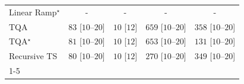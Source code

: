 \begin{tabular}{l|cccc|}
Linear Ramp$^\star$ & {\cellcolor[HTML]{000000}} \color[HTML]{F1F1F1} {\cellcolor{white}} \color{black} - & {\cellcolor[HTML]{000000}} \color[HTML]{F1F1F1} {\cellcolor{white}} \color{black} - & {\cellcolor[HTML]{000000}} \color[HTML]{F1F1F1} {\cellcolor{white}} \color{black} - & {\cellcolor[HTML]{000000}} \color[HTML]{F1F1F1} {\cellcolor{white}} \color{black} - \\
TQA & {\cellcolor[HTML]{E8F6E3}} \color[HTML]{000000} $83$ [$10$--$20$] & {\cellcolor[HTML]{F7FCF5}} \color[HTML]{000000} $10$ [$12$] & {\cellcolor[HTML]{005120}} \color[HTML]{F1F1F1} $659$ [$10$--$20$] & {\cellcolor[HTML]{6EC173}} \color[HTML]{000000} $358$ [$10$--$20$] \\
TQA$^\star$ & {\cellcolor[HTML]{E8F6E4}} \color[HTML]{000000} $81$ [$10$--$20$] & {\cellcolor[HTML]{F7FCF5}} \color[HTML]{000000} $10$ [$12$] & {\cellcolor[HTML]{005522}} \color[HTML]{F1F1F1} $653$ [$10$--$20$] & {\cellcolor[HTML]{D9F0D3}} \color[HTML]{000000} $131$ [$10$--$20$] \\
Recursive TS & {\cellcolor[HTML]{E8F6E4}} \color[HTML]{000000} $80$ [$10$--$20$] & {\cellcolor[HTML]{F7FCF5}} \color[HTML]{000000} $10$ [$12$] & {\cellcolor[HTML]{9ED798}} \color[HTML]{000000} $270$ [$10$--$20$] & {\cellcolor[HTML]{73C476}} \color[HTML]{000000} $349$ [$10$--$20$] \\
\cline{1-5}
\bottomrule
\end{tabular}
